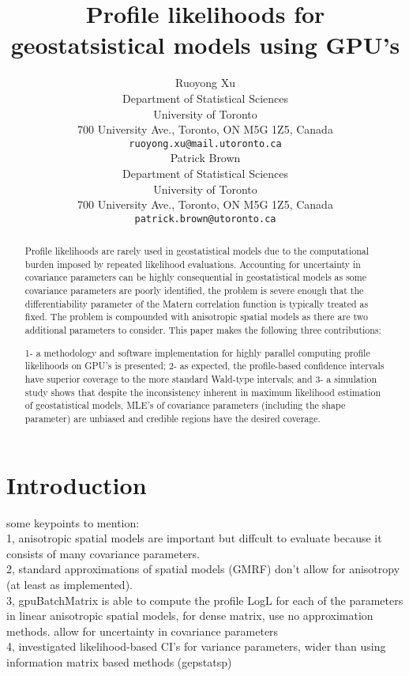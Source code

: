 \documentclass{article}\usepackage[]{graphicx}\usepackage[]{color}
\title{Profile likelihoods for geostatsistical models using GPU's}
\date{}
\author{
  Ruoyong Xu\\
  Department of Statistical Sciences\\
  University of Toronto\\
  700 University Ave., Toronto, ON M5G 1Z5, Canada\\
  \texttt{ruoyong.xu@mail.utoronto.ca} \\
   \And
  Patrick Brown\\
  Department of Statistical Sciences\\
  University of Toronto\\
  700 University Ave., Toronto, ON M5G 1Z5, Canada\\
  \texttt{patrick.brown@utoronto.ca} \\
}
\begin{document}
\maketitle
{}



\begin{abstract}
Profile likelihoods are rarely used in geostatistical models due to the computational burden imposed by repeated likelihood evaluations.
Accounting for uncertainty in covariance parameters can be highly consequential in geostatistical models as some covariance parameters are poorly identified, 
the problem is severe enough that the differentiability parameter of the Matern correlation function is typically treated as fixed.  
The problem is compounded with anisotropic spatial models as there are two additional parameters to consider.  
This paper makes the following three contributions:

1- a methodology and software implementation for highly parallel
computing profile likelihoods on GPU's is presented;
2- as expected, the profile-based confidence intervals have superior
coverage to the more standard Wald-type intervals; and
3- a simulation study shows that despite the inconsistency inherent in
maximum likelihood estimation of geostatistical models, MLE's of covariance parameters (including the shape parameter) are unbiased and
credible regions have the desired coverage.

\end{abstract}




\section{Introduction}











some keypoints to mention:\\
1, anisotropic spatial models are important but diffcult to evaluate because it consists of many covariance parameters.\\
2, standard approximations of spatial models (GMRF) don’t allow for anisotropy (at least as implemented). \\
3, gpuBatchMatrix is able to compute the profile LogL for each of the parameters in linear anisotropic spatial models, for dense matrix, use no approximation methods. allow for uncertainty in covariance parameters\\
4, investigated likelihood-based CI’s for variance parameters, wider than using information matrix based methods (gepstatsp)\\
\end{document}
